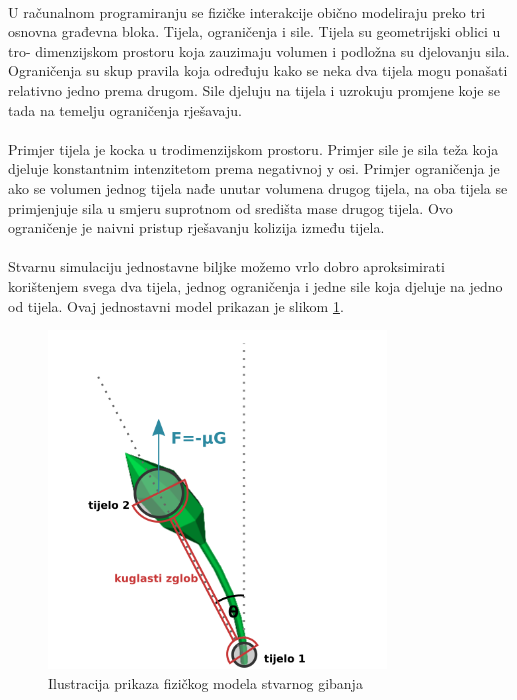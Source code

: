 \documentclass[times, utf8, diplomski]{fer}
\begin{document}
\paragraph{}
U računalnom programiranju se fizičke interakcije obično modeliraju preko tri osnovna  
građevna bloka. Tijela, ograničenja i sile. Tijela su geometrijski oblici u tro-
dimenzijskom prostoru koja zauzimaju volumen i podložna su djelovanju sila. Ograničenja 
su skup pravila koja određuju kako se neka dva tijela mogu ponašati relativno jedno prema 
drugom. Sile djeluju na tijela i uzrokuju promjene koje se tada na temelju ograničenja 
rješavaju.

\paragraph{}
Primjer tijela je kocka u trodimenzijskom prostoru. Primjer sile je sila teža koja djeluje 
konstantnim intenzitetom prema negativnoj y osi. Primjer ograničenja je ako se volumen 
jednog tijela nađe unutar volumena drugog tijela, na oba tijela se primjenjuje sila u smjeru 
suprotnom od središta mase drugog tijela. Ovo ograničenje je naivni pristup rješavanju 
kolizija između tijela.

\paragraph{}
Stvarnu simulaciju jednostavne biljke možemo vrlo dobro aproksimirati korištenjem svega dva 
tijela, jednog ograničenja i jedne sile koja djeluje na jedno od tijela. Ovaj jednostavni model prikazan je slikom \ref{fig:32-1}.

\begin{figure}[h]
	\centering
	\includegraphics[width=0.8\textwidth]{img/32-1}
	\caption{Ilustracija prikaza fizičkog modela stvarnog gibanja}
	\label{fig:32-1}
\end{figure}
\end{document}

